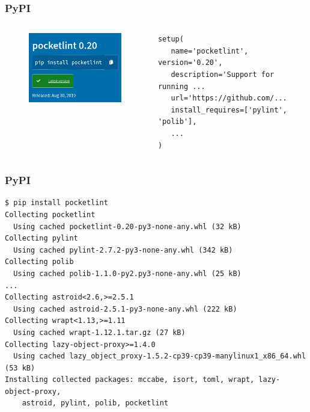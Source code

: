 \documentclass[aspectratio=169]{beamer}              %
\begin{document}
\begin{frame}[fragile]
	\frametitle{PyPI}
	
\begin{columns}
\begin{column}{0.4\textwidth}
\begin{figure}[ht!]
	\begin{center}
  	  \includegraphics[width=5cm]{img/pocketlint.png}
	\end{center}
	\end{figure}
\end{column}
\begin{column}{0.6\textwidth}
\begin{lstlisting}[frame=none, basicstyle=\ttfamily\small, escapechar=$, columns=fullflexible, keepspaces=true]
setup(
   name='pocketlint', version='0.20',
   description='Support for running ...
   url='https://github.com/...
   install_requires=['pylint', 'polib'],
   ...
)
\end{lstlisting}
\end{column}
\end{columns}
\end{frame}

\begin{frame}[fragile]
	\frametitle{PyPI}
	
\begin{lstlisting}[frame=none, basicstyle=\ttfamily\small, columns=fullflexible, keepspaces=true]
$ pip install pocketlint
Collecting pocketlint
  Using cached pocketlint-0.20-py3-none-any.whl (32 kB)
Collecting pylint
  Using cached pylint-2.7.2-py3-none-any.whl (342 kB)
Collecting polib
  Using cached polib-1.1.0-py2.py3-none-any.whl (25 kB)
...
Collecting astroid<2.6,>=2.5.1
  Using cached astroid-2.5.1-py3-none-any.whl (222 kB)
Collecting wrapt<1.13,>=1.11
  Using cached wrapt-1.12.1.tar.gz (27 kB)
Collecting lazy-object-proxy>=1.4.0
  Using cached lazy_object_proxy-1.5.2-cp39-cp39-manylinux1_x86_64.whl (53 kB)
Installing collected packages: mccabe, isort, toml, wrapt, lazy-object-proxy, 
	astroid, pylint, polib, pocketlint
\end{lstlisting}
	
\end{frame}
\end{document}
